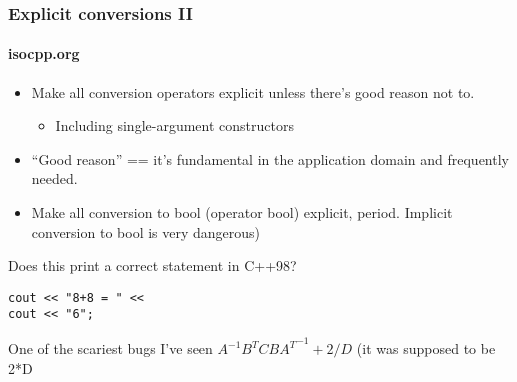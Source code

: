 \begin{frame}[fragile]
\frametitle{Explicit conversions II}
\framesubtitle{isocpp.org}


\begin{itemize}
\item Make all conversion operators explicit unless there's good
  reason not to.

  \begin{itemize}
    \item Including single-argument constructors
  \end{itemize}
\item ``Good reason'' == it's fundamental in the application domain
  and frequently needed.
\item Make all conversion to bool (operator bool) explicit, period.
  Implicit conversion to bool is very dangerous)
\end{itemize}
\pause{}
Does this print a correct statement in C++98?
\begin{verbatim}
cout << "8+8 = " <<
cout << "6";
\end{verbatim}

One of the scariest bugs I've seen
\vskip 6pt
$A^{-1}B^{T}CB{A^{T}}^{-1} + 2/D$
(it was supposed to be 2*D
\pause{}


\end{frame}
